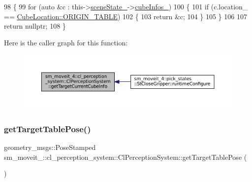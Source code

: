 \begin{DoxyCode}
98             \{
99                 \textcolor{keywordflow}{for} (\textcolor{keyword}{auto} &c : this->\hyperlink{classsm__moveit__4_1_1cl__perception__system_1_1ClPerceptionSystem_a82ea8feeb2fa43349f91ed59137b3890}{sceneState\_}->\hyperlink{classsm__moveit__4_1_1cl__perception__system_1_1CpSceneState_a734a45934cccf19ac5c886cd94bc8cda}{cubeInfos\_})
100                 \{
101                     \textcolor{keywordflow}{if} (c.location\_ == \hyperlink{namespacesm__moveit__4_1_1cl__perception__system_a0d1b8834532a7cf9d19670791eece6d1ae5ee34c3ef8ec4a46a00a218416c7b1d}{CubeLocation::ORIGIN\_TABLE})
102                     \{
103                         \textcolor{keywordflow}{return} &c;
104                     \}
105                 \}
106 
107                 \textcolor{keywordflow}{return} \textcolor{keyword}{nullptr};
108             \}
\end{DoxyCode}
Here is the caller graph for this function\+:
\nopagebreak
\begin{figure}[H]
\begin{center}
\leavevmode
\includegraphics[width=350pt]{classsm__moveit__4_1_1cl__perception__system_1_1ClPerceptionSystem_ac4b944cebb2055a85a33129665df5dcf_icgraph}
\end{center}
\end{figure}
\mbox{\label{classsm__moveit__4_1_1cl__perception__system_1_1ClPerceptionSystem_a84da4b68fddd1b2c81d69d5f7aafeb94}} 
\subsubsection{\texorpdfstring{get\+Target\+Table\+Pose()}{getTargetTablePose()}}
{\footnotesize\ttfamily geometry\+\_\+msgs\+::\+Pose\+Stamped sm\+\_\+moveit\+\_\+::cl\+\_\+perception\+\_\+system\+::\+Cl\+Perception\+System\+::get\+Target\+Table\+Pose (\begin{DoxyParamCaption}{ }\end{DoxyParamCaption})\hspace{0.3cm}{\ttfamily [inline]}}



